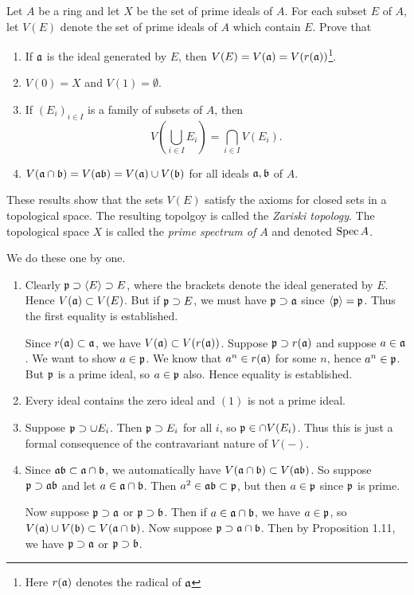 \documentclass[11pt, english]{article}
\begin{document}
\begin{exc}

Let $A$ be a ring and let $X$ be the set of prime ideals of $A$. For each subset $E$ of $A$, let $V(E)$ denote the set of prime ideals of $A$ which contain $E$. Prove that
\begin{enumerate}
\item If $\mathfrak{a}$ is the ideal generated by $E$, then $V(E)=V(\mathfrak{a})=V(r(\mathfrak{a}))$\footnote{Here $r(\mathfrak{a})$ denotes the radical of $\mathfrak{a}$}.
\item $V(0)=X$ and $V(1)=\emptyset$.
\item If $(E_i)_{i \in I}$ is a family of subsets of $A$, then
\[
V\left( \bigcup_{i \in I} E_i \right) = \bigcap_{i \in I} V\left(E_i\right).
\]
\item $V(\mathfrak{a} \cap \mathfrak{b})=V(\mathfrak{a} \mathfrak{b})=V(\mathfrak{a}) \cup V(\mathfrak{b})$ for all ideals $\mathfrak{a},\mathfrak{b}$ of $A$.
\end{enumerate}
These results show that the sets $V(E)$ satisfy the axioms for closed sets in a topological space. The resulting topolgoy is called the \emph{Zariski topology}. The topological space $X$ is called the \emph{prime spectrum of $A$} and denoted $\operatorname{Spec} A$.
\end{exc}

\begin{sol}
We do these one by one.
\begin{enumerate}
\item Clearly $\mathfrak{p} \supset \langle E \rangle \supset E$, where the brackets denote the ideal generated by $E$. Hence $V(\mathfrak{a}) \subset V(E)$. But if $\mathfrak{p} \supset E$, we must have $\mathfrak{p} \supset \mathfrak{a}$ since $\langle \mathfrak{p} \rangle = \mathfrak{p}$. Thus the first equality is established.

Since $r(\mathfrak{a}) \subset \mathfrak{a}$, we have $V(\mathfrak{a}) \subset V(r(\mathfrak{a}))$. Suppose $\mathfrak{p} \supset r(\mathfrak{a})$ and suppose $a \in \mathfrak{a}$. We want to show $a \in \mathfrak{p}$. We know that $a^n \in r(\mathfrak{a})$ for some $n$, hence $a^n \in \mathfrak{p}$. But $\mathfrak{p}$ is a prime ideal, so $a \in \mathfrak{p}$ also. Hence equality is established.
\item Every ideal contains the zero ideal and $(1)$ is not a prime ideal.
\item Suppose $\mathfrak{p} \supset \cup E_i$. Then $\mathfrak{p} \supset E_i$ for all $i$, so $\mathfrak{p} \in \cap V(E_i)$. Thus this is just a formal consequence of the contravariant nature of $V(-)$.
\item Since $\mathfrak{a} \mathfrak{b}  \subset \mathfrak{a} \cap \mathfrak{b}$, we automatically have $V(\mathfrak{a} \cap \mathfrak{b}) \subset V(\mathfrak{a} \mathfrak{b})$. So suppose $\mathfrak{p} \supset \mathfrak{a} \mathfrak{b}$ and let $a \in \mathfrak{a} \cap \mathfrak{b}$. Then $a^2 \in \mathfrak{a} \mathfrak{b} \subset \mathfrak{p}$, but then $a \in \mathfrak{p}$ since $\mathfrak{p}$ is prime.

Now suppose $\mathfrak{p} \supset \mathfrak{a}$ or $\mathfrak{p} \supset \mathfrak{b}$. Then if $a \in \mathfrak{a} \cap \mathfrak{b}$, we have $a \in \mathfrak{p}$, so $V(\mathfrak{a}) \cup V(\mathfrak{b}) \subset V(\mathfrak{a} \cap \mathfrak{b})$. Now suppose $\mathfrak{p} \supset \mathfrak{a} \cap \mathfrak{b}$. Then by Proposition 1.11, we have $\mathfrak{p} \supset \mathfrak{a}$ or $\mathfrak{p} \supset \mathfrak{b}$. 
\end{enumerate}
\end{sol}
\end{document}
